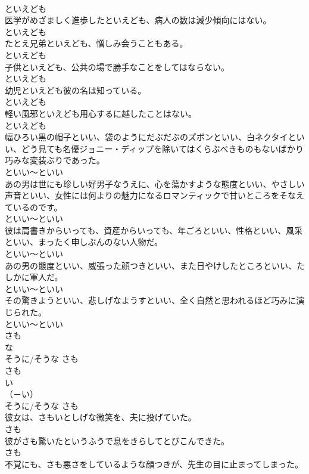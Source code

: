 \documentclass[8pt]{extreport}
\begin{document}
\begin{CJK}{UTF8}{min}
\\	といえども
\\	医学がめざましく進歩したといえども、病人の数は減少傾向にはない。	
\\	といえども
\\	たとえ兄弟といえども、憎しみ会うこともある。	
\\	といえども
\\	子供といえども、公共の場で勝手なことをしてはならない。	
\\	といえども
\\	幼児といえども彼の名は知っている。	
\\	といえども
\\	軽い風邪といえども用心するに越したことはない。	
\\	といえども
\\	幅ひろい黒の帽子といい、袋のようにだぶだぶのズボンといい、白ネクタイといい、どう見ても名優ジョニー・ディップを除いてはくらぶべきものもないばかり巧みな変装ぶりであった。	
\\	といい～といい
\\	あの男は世にも珍しい好男子なうえに、心を蕩かすような態度といい、やさしい声音といい、女性には何よりの魅力になるロマンティックで甘いところをそなえているのです。	
\\	といい～といい
\\	彼は肩書きからいっても、資産からいっても、年ごろといい、性格といい、風采といい、まったく申しぶんのない人物だ。	
\\	といい～といい
\\	あの男の態度といい、威張った顔つきといい、また日やけしたところといい、たしかに軍人だ。	
\\	といい～といい
\\	その驚きようといい、悲しげなようすといい、全く自然と思われるほど巧みに演じられた。	
\\	といい～といい
\\	さも 
\\	な
\\	そうに/そうな	さも 
\\	さも 
\\	い
\\	（－い） 
\\	そうに/そうな	さも
\\	彼女は、さもいとしげな微笑を、夫に投げていた。	
\\	さも
\\	彼がさも驚いたというふうで息をきらしてとびこんできた。	
\\	さも
\\	不覚にも、さも悪さをしているような顔つきが、先生の目に止まってしまった。	

\end{CJK}
\end{document}
